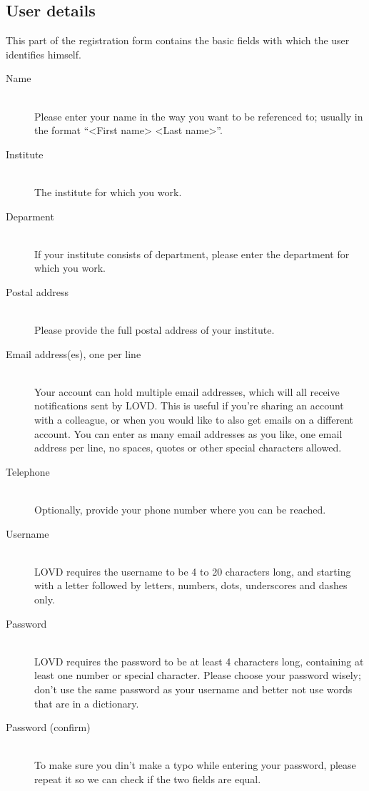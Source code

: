 \pagebreak[4] %
\subsection{User details}
This part of the registration form contains the basic fields with which the user identifies himself.
\begin{description}
  \item[Name] \hfill \\
  Please enter your name in the way you want to be referenced to; usually in the format ``<First name> <Last name>''.
  \item[Institute] \hfill \\
  The institute for which you work.
  \item[Deparment] \hfill \\
  If your institute consists of department, please enter the department for which you work.
  \item[Postal address] \hfill \\
  Please provide the full postal address of your institute.
  \item[Email address(es), one per line] \hfill \\
  Your account can hold multiple email addresses, which will all receive notifications sent by LOVD.
  This is useful if you're sharing an account with a colleague, or when you would like to also get emails on a different account.
  You can enter as many email addresses as you like, one email address per line, no spaces, quotes or other special characters allowed.
  \item[Telephone] \hfill \\
  Optionally, provide your phone number where you can be reached.
  \item[Username] \hfill \\
  LOVD requires the username to be 4 to 20 characters long, and starting with a letter followed by letters, numbers, dots, underscores and dashes only.
  \item[Password] \hfill \\
  LOVD requires the password to be at least 4 characters long, containing at least one number or special character.
  Please choose your password wisely; don't use the same password as your username and better not use words that are in a dictionary.
  \item[Password (confirm)] \hfill \\
  To make sure you din't make a typo while entering your password, please repeat it so we can check if the two fields are equal.
\end{description}



